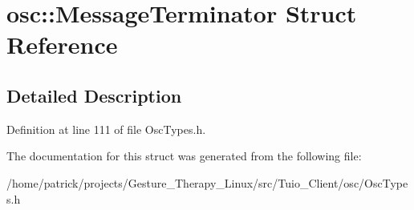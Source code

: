 \hypertarget{structosc_1_1_message_terminator}{}\section{osc\+:\+:Message\+Terminator Struct Reference}
\label{structosc_1_1_message_terminator}


\subsection{Detailed Description}


Definition at line 111 of file Osc\+Types.\+h.



The documentation for this struct was generated from the following file\+:\begin{DoxyCompactItemize}
\item 
/home/patrick/projects/\+Gesture\+\_\+\+Therapy\+\_\+\+Linux/src/\+Tuio\+\_\+\+Client/osc/Osc\+Types.\+h\end{DoxyCompactItemize}
